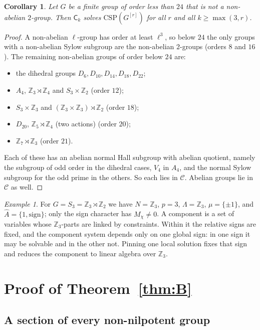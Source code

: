 \documentclass[11pt]{article}
\newtheorem{corollary}[theorem]{Corollary}
\theoremstyle{definition}
\theoremstyle{remark}
\newtheorem{example}[theorem]{Example}
\newcommand{\Csp}{\mathrm{CSP}}
\newcommand{\Coh}{\mathsf{C}}
\newcommand{\Z}{\mathbb Z}
\newcommand{\Chars}{\widehat{A}}
\begin{document}
\begin{corollary}\label{cor:small}
Let $G$ be a finite group of order less than $24$ that is not a non-abelian
$2$-group. Then $\Coh_k$ solves $\Csp(G^{[r]})$ for all $r$ and all $k\ge\max(3,r)$.
\end{corollary}
\begin{proof}
A non-abelian $\ell$-group has order at least $\ell^3$, so below $24$ the only
groups with a non-abelian Sylow subgroup are the non-abelian $2$-groups (orders
$8$ and $16$). The remaining non-abelian groups of order below $24$ are:
\begin{itemize}
\item the dihedral groups $D_6,D_{10},D_{14},D_{18},D_{22}$;
\item $A_4$, $\Z_3\rtimes\Z_4$ and $S_3\times\Z_2$ (order $12$);
\item $S_3\times\Z_3$ and $(\Z_3\times\Z_3)\rtimes\Z_2$ (order $18$);
\item $D_{20}$, $\Z_5\rtimes\Z_4$ (two actions) (order $20$);
\item $\Z_7\rtimes\Z_3$ (order $21$).
\end{itemize}
Each of these has an abelian normal Hall subgroup with abelian quotient, namely
the subgroup of odd order in the dihedral cases, $V_4$ in $A_4$, and the normal
Sylow subgroup for the odd prime in the others. So each lies in $\mathcal C$.
Abelian groups lie in $\mathcal C$ as well.
\end{proof}

\begin{example}
For $G=S_3=\Z_3\rtimes\Z_2$ we have $N=\Z_3$, $p=3$, $\Lambda=\Z_3$,
$\mu=\{\pm1\}$, and $\Chars=\{1,\mathrm{sign}\}$; only the sign character has
$M_\chi\ne0$. A component is a set of variables whose $\Z_3$-parts are linked by
constraints. Within it the relative signs are fixed, and the component system
depends only on one global sign: in one sign it may be solvable and in the other
not. Pinning one local solution fixes that sign and reduces the component to
linear algebra over $\Z_3$.
\end{example}

\section{Proof of Theorem~\ref{thm:B}}\label{sec:B}

\subsection{A section of every non-nilpotent group}
\end{document}
